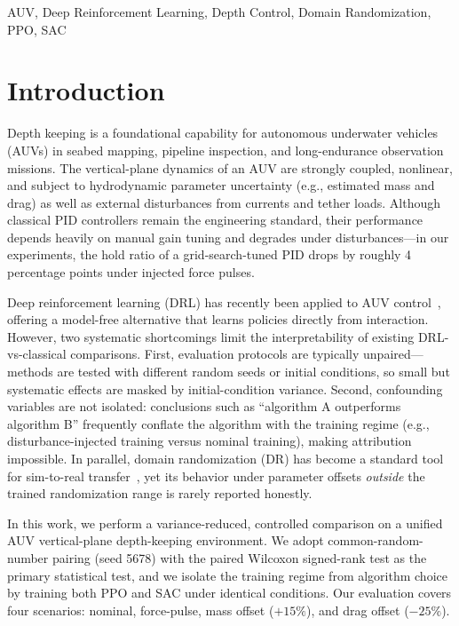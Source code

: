 \documentclass[conference]{IEEEtran}
\begin{document}
\begin{IEEEkeywords}
AUV, Deep Reinforcement Learning, Depth Control, Domain Randomization, PPO, SAC
\end{IEEEkeywords}

\section{Introduction}
Depth keeping is a foundational capability for autonomous underwater vehicles (AUVs) in seabed mapping, pipeline inspection, and long-endurance observation missions. The vertical-plane dynamics of an AUV are strongly coupled, nonlinear, and subject to hydrodynamic parameter uncertainty (e.g., estimated mass and drag) as well as external disturbances from currents and tether loads. Although classical PID controllers remain the engineering standard, their performance depends heavily on manual gain tuning and degrades under disturbances---in our experiments, the hold ratio of a grid-search-tuned PID drops by roughly 4 percentage points under injected force pulses.

Deep reinforcement learning (DRL) has recently been applied to AUV control~\cite{wu2017depth}, offering a model-free alternative that learns policies directly from interaction. However, two systematic shortcomings limit the interpretability of existing DRL-vs-classical comparisons. First, evaluation protocols are typically unpaired---methods are tested with different random seeds or initial conditions, so small but systematic effects are masked by initial-condition variance. Second, confounding variables are not isolated: conclusions such as ``algorithm A outperforms algorithm B'' frequently conflate the algorithm with the training regime (e.g., disturbance-injected training versus nominal training), making attribution impossible. In parallel, domain randomization (DR) has become a standard tool for sim-to-real transfer~\cite{tobin2017dr,peng2018}, yet its behavior under parameter offsets \emph{outside} the trained randomization range is rarely reported honestly.

In this work, we perform a variance-reduced, controlled comparison on a unified AUV vertical-plane depth-keeping environment. We adopt common-random-number pairing (seed 5678) with the paired Wilcoxon signed-rank test as the primary statistical test, and we isolate the training regime from algorithm choice by training both PPO and SAC under identical conditions. Our evaluation covers four scenarios: nominal, force-pulse, mass offset ($+15\%$), and drag offset ($-25\%$).
\end{document}
